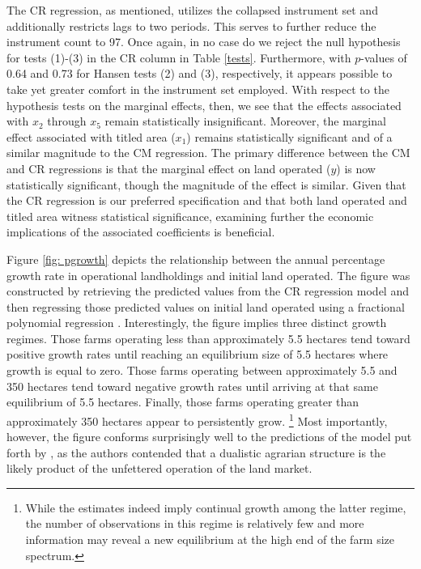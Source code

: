 \documentclass[english]{article}
\begin{document}
The CR regression, as mentioned, utilizes the collapsed instrument set and 
additionally restricts lags to two periods.
This serves to further reduce the instrument count to 97.
Once again, in no case do we reject the null hypothesis for tests (1)-(3) in the 
CR column in Table \ref{tests}. 
Furthermore, with $p$-values of 0.64 and 0.73 for Hansen tests (2) and (3), 
respectively, it appears possible to take yet greater comfort in the instrument 
set employed.
With respect to the hypothesis tests on the marginal effects, then, we see that 
the effects associated with $x_2$ through $x_5$ remain statistically 
insignificant.  
Moreover, the marginal effect associated with titled area ($x_1$) remains 
statistically significant and of a similar magnitude to the CM regression.
The primary difference between the CM and CR regressions is that the 
marginal effect on land operated ($y$) is now statistically significant, 
though the magnitude of the effect is similar.
Given that the CR regression is our preferred specification and that both 
land operated and titled area witness statistical significance, examining 
further the economic implications of the associated coefficients is 
beneficial.

Figure \ref{fig: pgrowth} depicts the relationship between the annual 
percentage growth rate in operational landholdings and initial land 
operated.
The figure was constructed by retrieving the predicted values from the 
CR regression model and then regressing those predicted values on 
initial land operated using a fractional polynomial regression 
\citep{royston1994}.
Interestingly, the figure implies three distinct growth regimes.
Those farms operating less than approximately 5.5 hectares tend toward 
positive growth rates until reaching an equilibrium size of 5.5 hectares
where growth is equal to zero.
Those farms operating between approximately 5.5 and 350 hectares tend 
toward negative growth rates until arriving at that same equilibrium of 
5.5 hectares.
Finally, those farms operating greater than approximately 350 hectares 
appear to persistently grow.%
\footnote{While the estimates indeed imply continual growth among the 
latter regime, the number of observations in this regime is relatively few and 
more information may reveal a new equilibrium at the high end of the farm 
size spectrum.}
Most importantly, however, the figure conforms surprisingly well to the 
predictions of the model put forth by \citet{carter1993}, as the authors
contended that a dualistic agrarian structure is the likely product of the 
unfettered operation of the land market.
\end{document}
